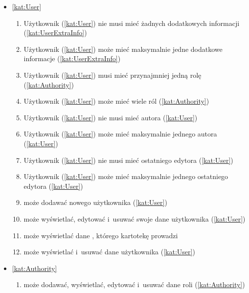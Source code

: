 \begin{itemize}[label={\textbf{Reguły dla}}, wide, labelwidth=!, labelindent=0pt]
    \setlength\itemsep{1.75em}
    \item\ref{kat:User}\mynobreakpar
    \begin{enumerate}[label={\textbf{REG/1/\protect\twodigits{\arabic{enumi}}}}, wide, labelwidth=!, align=left, leftmargin=3cm]
        \item Użytkownik (\ref{kat:User}) nie musi mieć żadnych dodatkowych informacji (\ref{kat:UserExtraInfo})
        \item Użytkownik (\ref{kat:User}) może mieć maksymalnie jedne dodatkowe informacje (\ref{kat:UserExtraInfo})
        \item Użytkownik (\ref{kat:User}) musi mieć przynajmniej jedną rolę (\ref{kat:Authority})
        \item Użytkownik (\ref{kat:User}) może mieć wiele ról (\ref{kat:Authority})
        \item Użytkownik (\ref{kat:User}) nie musi mieć autora (\ref{kat:User})
        \item Użytkownik (\ref{kat:User}) może mieć maksymalnie jednego autora (\ref{kat:User})
        \item Użytkownik (\ref{kat:User}) nie musi mieć ostatniego edytora (\ref{kat:User})
        \item Użytkownik (\ref{kat:User}) może mieć maksymalnie jednego ostatniego edytora (\ref{kat:User})
        \item {} może dodawać nowego użytkownika (\ref{kat:User})
        \item {} może wyświetlać, edytować i~usuwać swoje dane użytkownika (\ref{kat:User})
        \item {} może wyświetlać dane , którego kartotekę prowadzi
        \item {} może wyświetlać i~usuwać dane użytkownika (\ref{kat:User})
    \end{enumerate}
    \item\ref{kat:Authority}\mynobreakpar
    \begin{enumerate}[label={\textbf{REG/1/\protect\twodigits{\arabic{enumi}}}}, wide, labelwidth=!, align=left, leftmargin=3cm, resume]
        \item {} może dodawać, wyświetlać, edytować i~usuwać dane roli (\ref{kat:Authority})
    \end{enumerate}

\end{itemize}
